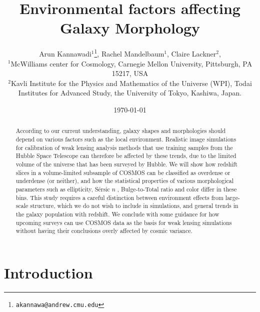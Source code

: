 \documentclass[twocolumn,useAMS,usenatbib]{mn2e}
\title[WL simulation]{Environmental factors affecting Galaxy Morphology}
\author[Kannawadi et al.]
{Arun Kannawadi$^1$\thanks{\tt akannawa@andrew.cmu.edu}, 
Rachel Mandelbaum$^1$,
Claire Lackner$^2$, 
\\$^1$McWilliams center for Cosmology, Carnegie Mellon University, Pittsburgh, PA 15217, USA
\\$^2$Kavli Institute for the Physics and Mathematics of the Universe (WPI), Todai Institutes for Advanced Study, the University of Tokyo, Kashiwa, Japan.
}
\date{\today}
\newcommand{\sersicn}{S\'{e}rsic $n$ }
\newcommand{\btt}{Bulge-to-Total }
\begin{document}

\maketitle

\begin{abstract}
According to our current understanding, galaxy shapes and morphologies should depend on various factors such as the local environment. Realistic image simulations for calibration of weak lensing analysis methods that use training samples from the Hubble Space Telescope can therefore be affected by these trends, due to the limited volume of the universe that has been surveyed by Hubble. We will show how redshift slices in a volume-limited subsample of COSMOS can be classified as overdense or underdense (or neither), and how the statistical properties of various morphological parameters such as ellipticity, \sersicn, \btt ratio and color differ in these bins. This study requires a careful distinction between environment effects from large-scale structure, which we do not wish to include in simulations, and general trends in the galaxy population with redshift. We conclude with some guidance for how upcoming surveys can use COSMOS data as the basis for weak lensing simulations without having their conclusions overly affected by cosmic variance.  
\end{abstract}

\begin{keywords}
  
\end{keywords}

\section{Introduction}
\label{S:intro}
\end{document}
